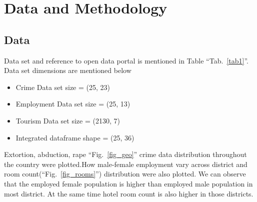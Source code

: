\documentclass[conference]{IEEEtran}
\begin{document}
\section{Data and Methodology}

\subsection{Data}
Data set and reference to open data portal is mentioned in Table ``Tab.~\ref{tab1}''. Data set dimensions are mentioned below
\begin{itemize}
    \item Crime Data set size =  (25, 23)
    \item Employment Data set size =  (25, 13)
    \item Tourism Data set size =  (2130, 7)
    \item Integrated dataframe shape =  (25, 36)
\end{itemize}
Extortion, abduction, rape ``Fig.~\ref{fig_geo}'' crime data distribution throughout the country were plotted.How male-female employment vary across district and room count(``Fig.~\ref{fig_rooms}'') distribution were also plotted. We can observe that the employed female population is higher than employed male population in most district. At the same time hotel room count is also higher in those districts. 
\end{document}
